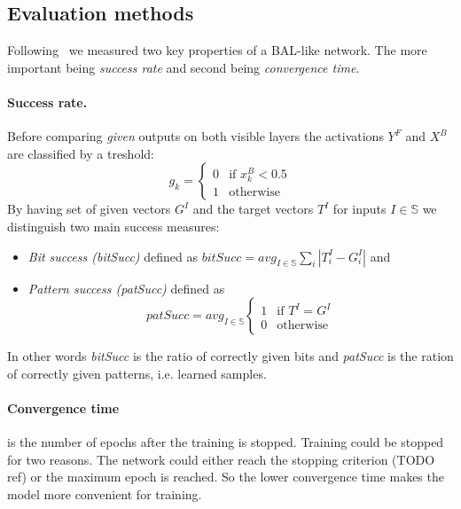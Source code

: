 
\subsection{Evaluation methods} 
\label{sec:sim-evaluation} 

Following~\citet{farkas2013bal} we measured two key properties of a BAL-like network. The more important being \emph{success rate} and second being \emph{convergence time}. 

\paragraph{Success rate.}  
Before comparing \emph{given} outputs on both visible layers the activations $Y^F$ and $X^B$ are classified by a treshold: 
\begin{equation} 
  g_k =
  \left\{
	  \begin{array}{ll}
		  0 & \mbox{if } x_k^B < 0.5 \\
		  1 & \mbox{otherwise}
	  \end{array}
  \right.  
\end{equation} 
By having set of given vectors $G^I$ and the target vectors $T^I$ for inputs $I \in \mathbb{S}$ we distinguish two main success measures: 
\begin{itemize}
  \item \emph{Bit success (bitSucc)} defined as $bitSucc = avg_{I \in \mathbb{S}} \sum_i |T_i^I - G^I_i|$ and 
  \item \emph{Pattern success (patSucc)} defined as 
    \begin{equation}
      patSucc = avg_{I \in \mathbb{S}} \left\{
	      \begin{array}{ll}
		      1 & \mbox{if } T^I = G^I \\
		      0 & \mbox{otherwise}
	      \end{array}
      \right.
    \end{equation} 
\end{itemize} 
In other words \emph{bitSucc} is the ratio of correctly given bits and \emph{patSucc} is the ration of correctly given patterns, i.e. learned samples. 

\paragraph{Convergence time} is the number of epochs after the training is stopped. Training could be stopped for two reasons. The network could either reach the stopping criterion (TODO ref) or the maximum epoch is reached. So the lower convergence time makes the model more convenient for training.  
